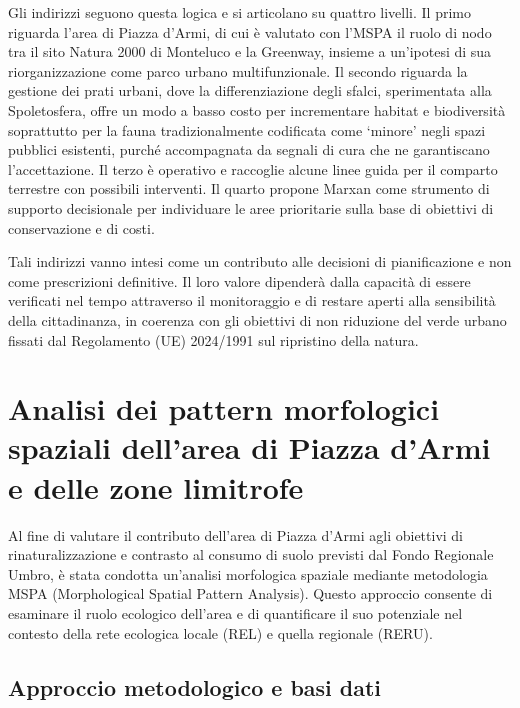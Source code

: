 \documentclass[
  a4paper,
]{book}
\begin{document}
Gli indirizzi seguono questa logica e si articolano su quattro livelli.
Il primo riguarda l'area di Piazza d'Armi, di cui è valutato con l'MSPA il ruolo di nodo tra il sito Natura 2000 di Monteluco e la Greenway, insieme a un'ipotesi di sua riorganizzazione come parco urbano multifunzionale.
Il secondo riguarda la gestione dei prati urbani, dove la differenziazione degli sfalci, sperimentata alla Spoletosfera, offre un modo a basso costo per incrementare habitat e biodiversità soprattutto per la fauna tradizionalmente codificata come `minore' negli spazi pubblici esistenti, purché accompagnata da segnali di cura che ne garantiscano l'accettazione.
Il terzo è operativo e raccoglie alcune linee guida per il comparto terrestre con possibili interventi.
Il quarto propone Marxan come strumento di supporto decisionale per individuare le aree prioritarie sulla base di obiettivi di conservazione e di costi.

Tali indirizzi vanno intesi come un contributo alle decisioni di pianificazione e non come prescrizioni definitive.
Il loro valore dipenderà dalla capacità di essere verificati nel tempo attraverso il monitoraggio e di restare aperti alla sensibilità della cittadinanza, in coerenza con gli obiettivi di non riduzione del verde urbano fissati dal Regolamento (UE) 2024/1991 sul ripristino della natura.

\section{Analisi dei pattern morfologici spaziali dell'area di Piazza d'Armi e delle zone limitrofe}\label{analisi-dei-pattern-morfologici-spaziali-dellarea-di-piazza-darmi-e-delle-zone-limitrofe}

Al fine di valutare il contributo dell'area di Piazza d'Armi agli obiettivi di rinaturalizzazione e contrasto al consumo di suolo previsti dal Fondo Regionale Umbro, è stata condotta un'analisi morfologica spaziale mediante metodologia MSPA (Morphological Spatial Pattern Analysis).
Questo approccio consente di esaminare il ruolo ecologico dell'area e di quantificare il suo potenziale nel contesto della rete ecologica locale (REL) e quella regionale (RERU).

\subsection{Approccio metodologico e basi dati}\label{approccio-metodologico-e-basi-dati-1}
\end{document}
